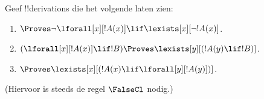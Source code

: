 \documentclass[../../../include/open-logic-section]{subfiles}
\begin{document}
\begin{prob}
Geef !!{derivation}s die het volgende laten zien:
\begin{enumerate}
\item $\Proves \lnot\lforall[x][!A(x)] \lif \lexists[x][\lnot!A(x)]$.
\item $(\lforall[x][!A(x)] \lif !B) \Proves \lexists[y][(!A(y) \lif !B)]$.
\item $\Proves \lexists[x][(!A(x) \lif \lforall[y][!A(y)])]$.
\end{enumerate}
(Hiervoor is steeds de regel $\FalseCl$ nodig.)
\end{prob}
\end{document}
